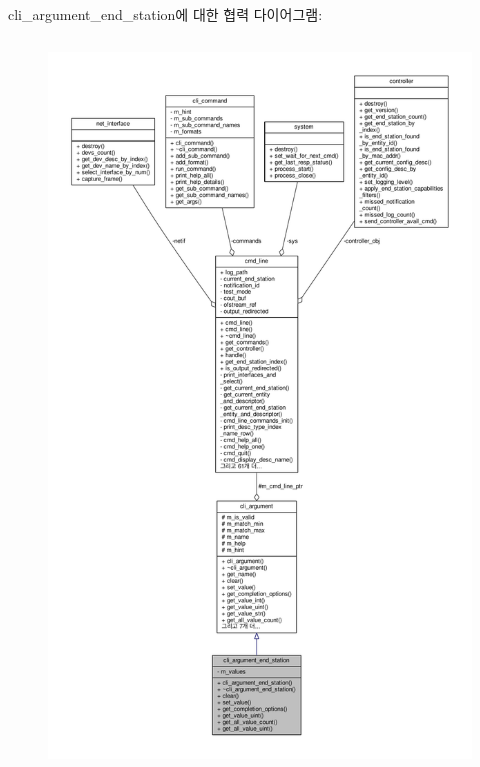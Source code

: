 cli\+\_\+argument\+\_\+end\+\_\+station에 대한 협력 다이어그램\+:
\nopagebreak
\begin{figure}[H]
\begin{center}
\leavevmode
\includegraphics[height=550pt]{classcli__argument__end__station__coll__graph}
\end{center}
\end{figure}
